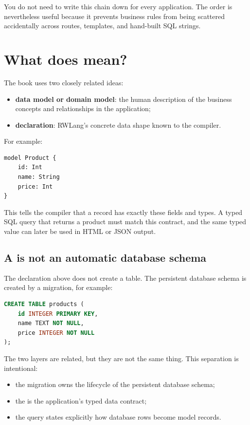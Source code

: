 You do not need to write this chain down for every application. The order is nevertheless useful because it prevents business rules from being scattered accidentally across routes, templates, and hand-built SQL strings.

\section{What does  mean?}

The book uses two closely related ideas:

\begin{itemize}
  \item \textbf{data model or domain model}: the human description of the business concepts and relationships in the application;
  \item \textbf{ declaration}: RWLang's concrete data shape known to the compiler.
\end{itemize}

For example:

\begin{lstlisting}[language=RWLang]
model Product {
    id: Int
    name: String
    price: Int
}
\end{lstlisting}

This tells the compiler that a  record has exactly these fields and types. A typed SQL query that returns a product must match this contract, and the same typed value can later be used in HTML or JSON output.

\subsection*{A  is not an automatic database schema}

The declaration above does not create a  table. The persistent database schema is created by a migration, for example:

\begin{lstlisting}[language=SQL]
CREATE TABLE products (
    id INTEGER PRIMARY KEY,
    name TEXT NOT NULL,
    price INTEGER NOT NULL
);
\end{lstlisting}

The two layers are related, but they are not the same thing. This separation is intentional:

\begin{itemize}
  \item the migration owns the lifecycle of the persistent database schema;
  \item the  is the application's typed data contract;
  \item the query states explicitly how database rows become model records.
\end{itemize}


